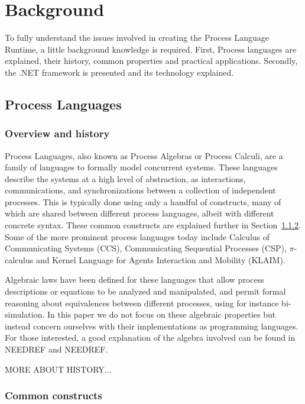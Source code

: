 \chapter{Background}

	To fully understand the issues involved in creating the Process Language 
	Runtime, a little background knowledge is required. First, Process 
	languages are explained, their history, common properties and practical 
	applications. Secondly, the .NET framework is presented and its technology
	explained.

\section{Process Languages}

\subsection{Overview and history}

	Process Languages, also known as Process Algebras or Process Calculi, are a
	family of languages to formally model concurrent systems. These languages 
	describe the systems at a high level of abstraction, as interactions, 
	communications, and synchronizations between a collection of independent
	processes. This is typically done using only a handful of constructs, many 
	of which are shared between different process languages, albeit 
	with different concrete syntax. These common constructs are explained 
	further in Section~\ref{common_constructs}. Some of the more prominent 
	process languages today include Calculus of Communicating Systems (CCS), 
	Communicating Sequential Processes (CSP), $\pi$-calculus and Kernel Language 
	for Agents Interaction and Mobility (KLAIM).
	
	Algebraic laws have been defined for these languages that allow process 
	descriptions or equations to be analyzed and manipulated, and permit formal 
	reasoning about equivalences between different processes, using for instance 
	bi-simulation. In this paper we do not focus on these algebraic properties 
	but instead concern ourselves with their implementations as programming 
	languages. For those interested, a good explanation of the algebra involved 
	can be found in NEEDREF and NEEDREF. 
	
	MORE ABOUT HISTORY...
		
	
\subsection{Common constructs}\label{common_constructs}
	
